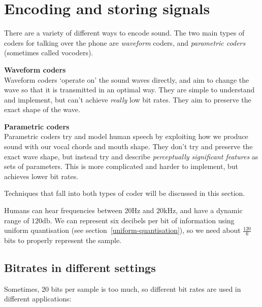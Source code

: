 \section{Encoding and storing signals}

There are a variety of different ways to encode sound. The two main types of
coders for talking over the phone are \textit{waveform} coders, and
\textit{parametric coders} (sometimes called vocoders).

\begin{description}
  \item \textbf{Waveform coders}\\
  Waveform coders `operate on' the sound waves directly, and aim to change the
  wave so that it is transmitted in an optimal way. They are simple to
  understand and implement, but can't achieve \textit{really} low bit rates.
  They aim to preserve the exact shape of the wave.

  \item \textbf{Parametric coders}\\
  Parametric coders try and model human speech by exploiting how we produce
  sound with our vocal chords and mouth shape. They don't try and preserve the
  exact wave shape, but instead try and describe \textit{perceptually
  significant features} as sets of parameters. This is more complicated and
  harder to implement, but achieves lower bit rates.
\end{description}

Techniques that fall into both types of coder will be discussed in this section.


Humans can hear frequencies between $20\si{\hertz}$ and $20\si{\kilo\hertz}$,
and have a dynamic range of $120\si{\decibel}$. We can represent six decibels
per bit of information using uniform quantisation (see section~\ref{uniform-quantisation}),
so we need about $\frac{120}{6}$ bits to properly represent the sample.

\subsection{Bitrates in different settings}

Sometimes, 20 bits per sample is too much, so different bit rates are used in
different applications:

